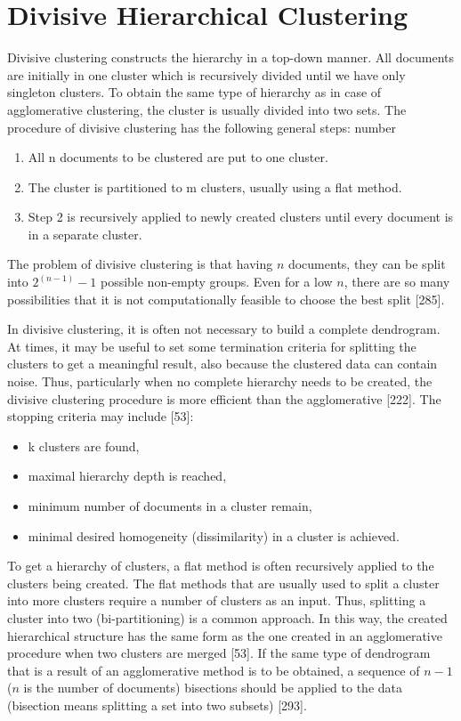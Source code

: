 \documentclass[11pt,openany,executivepaper]{book}
\begin{document}
\section{Divisive Hierarchical Clustering}
Divisive clustering constructs the hierarchy in a top-down manner. All documents are initially in one cluster which is recursively divided until we have only
singleton clusters. To obtain the same type of hierarchy as in case of agglomerative clustering, the cluster is usually divided into two sets.
The procedure of divisive clustering has the following general steps:
number
\begin{enumerate}
	\item All n documents to be clustered are put to one cluster.
	\item The cluster is partitioned to m clusters, usually using a flat method.
	\item Step 2 is recursively applied to newly created clusters until every document is in a separate cluster.
\end{enumerate}

The problem of divisive clustering is that having $n$ documents, they can be split into $2^{(n-1)} - 1$ possible non-empty groups. Even for a low $n$, there are so many possibilities that it is not computationally feasible to choose the best split [285].

In divisive clustering, it is often not necessary to build a complete dendrogram. At times, it may be useful to set some termination criteria for splitting the clusters to get a meaningful result, also because the clustered data can contain noise. Thus, particularly when no complete hierarchy needs to be created, the divisive clustering procedure is more efficient than the agglomerative [222]. 
The stopping criteria may include [53]:

\begin{itemize}
    \item k clusters are found,
    \item maximal hierarchy depth is reached,
    \item minimum number of documents in a cluster remain,
    \item minimal desired homogeneity (dissimilarity) in a cluster is achieved.
\end{itemize}

To get a hierarchy of clusters, a flat method is often recursively applied to the clusters being created. The flat methods that are usually used to split a cluster into more clusters require a number of clusters as an input. Thus, splitting a cluster into two (bi-partitioning) is a common approach. In this way, the created hierarchical structure has the same form as the one created in an agglomerative procedure when two clusters are merged [53]. If the same type of dendrogram that is a result of an agglomerative method is to be obtained, a sequence of $n-1$ ($n$ is the number of documents) bisections should be applied to the data (bisection means splitting a set into two subsets) [293].
\end{document}
